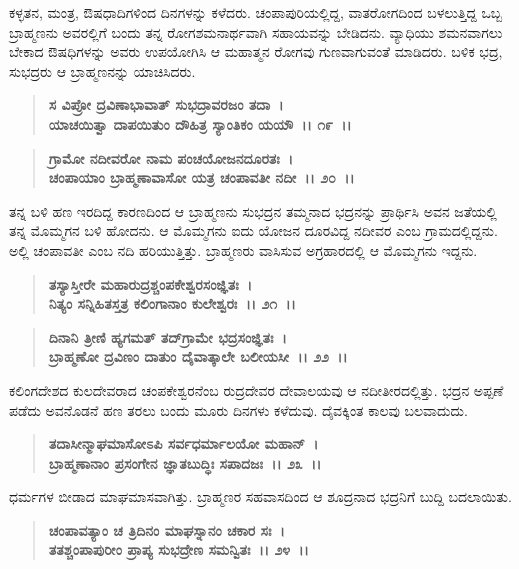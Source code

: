 ಕಳ್ಳತನ, ಮಂತ್ರ, ಔಷಧಾದಿಗಳಿಂದ ದಿನಗಳನ್ನು ಕಳೆದರು. ಚಂಪಾಪುರಿಯಲ್ಲಿದ್ದ, ವಾತರೋಗದಿಂದ ಬಳಲುತ್ತಿದ್ದ ಒಬ್ಬ ಬ್ರಾಹ್ಮಣನು ಅವರಲ್ಲಿಗೆ ಬಂದು ತನ್ನ ರೋಗಶಮನಾರ್ಥವಾಗಿ ಸಹಾಯವನ್ನು ಬೇಡಿದನು. ವ್ಯಾಧಿಯು ಶಮನವಾಗಲು ಬೇಕಾದ ಔಷಧಿಗಳನ್ನು ಅವರು ಉಪಯೋಗಿಸಿ ಆ ಮಹಾತ್ಮನ ರೋಗವು ಗುಣವಾಗುವಂತೆ ಮಾಡಿದರು. ಬಳಿಕ ಭದ್ರ, ಸುಭದ್ರರು ಆ ಬ್ರಾಹ್ಮಣನನ್ನು ಯಾಚಿಸಿದರು.

\begin{verse}
\textbf{ಸ ವಿಪ್ರೋ ದ್ರವಿಣಾಭಾವಾತ್ ಸುಭದ್ರಾವರಜಂ ತದಾ~।}\\\textbf{ಯಾಚಯಿತ್ವಾ ದಾಪಯಿತುಂ ದೌಹಿತ್ರ ಸ್ಯಾಂತಿಕಂ ಯಯೌ~।। ೧೯~।। }
\end{verse}

\begin{verse}
\textbf{ಗ್ರಾಮೋ ನದೀವರೋ ನಾಮ ಪಂಚಯೋಜನದೂರತಃ~।}\\\textbf{ಚಂಪಾಯಾಂ ಬ್ರಾಹ್ಮಣಾವಾಸೋ ಯತ್ರ ಚಂಪಾವತೀ ನದೀ~।। ೨೦~।।}
\end{verse}

ತನ್ನ ಬಳಿ ಹಣ ಇರದಿದ್ದ ಕಾರಣದಿಂದ ಆ ಬ್ರಾಹ್ಮಣನು ಸುಭದ್ರನ ತಮ್ಮನಾದ ಭದ್ರನನ್ನು ಪ್ರಾರ್ಥಿಸಿ ಅವನ ಜತೆಯಲ್ಲಿ ತನ್ನ ಮೊಮ್ಮಗನ ಬಳಿ ಹೋದನು. ಆ ಮೊಮ್ಮಗನು ಐದು ಯೋಜನ ದೂರವಿದ್ದ ನದೀವರ ಎಂಬ ಗ್ರಾಮದಲ್ಲಿದ್ದನು. ಅಲ್ಲಿ ಚಂಪಾವತೀ ಎಂಬ ನದಿ ಹರಿಯುತ್ತಿತ್ತು. ಬ್ರಾಹ್ಮಣರು ವಾಸಿಸುವ ಅಗ್ರಹಾರದಲ್ಲಿ ಆ ಮೊಮ್ಮಗನು ಇದ್ದನು.

\begin{verse}
\textbf{ತಸ್ಯಾಸ್ತೀರೇ ಮಹಾರುದ್ರಶ್ಚಂಪಕೇಶ್ವರಸಂಜ್ಞಿತಃ~।}\\\textbf{ನಿತ್ಯಂ ಸನ್ನಿಹಿತಸ್ತತ್ರ ಕಲಿಂಗಾನಾಂ ಕುಲೇಶ್ವರಃ~।। ೨೧~।। }
\end{verse}

\begin{verse}
\textbf{ದಿನಾನಿ ತ್ರೀಣಿ ಹ್ಯಗಮತ್ ತದ್‌ಗ್ರಾಮೇ ಭದ್ರಸಂಜ್ಞಿತಃ~।}\\\textbf{ಬ್ರಾಹ್ಮಣೋ ದ್ರವಿಣಂ ದಾತುಂ ದೈವಾತ್ಕಾಲೇ ಬಲೀಯಸೀ~।। ೨೨~।।}
\end{verse}

ಕಲಿಂಗದೇಶದ ಕುಲದೇವರಾದ ಚಂಪಕೇಶ್ವರನೆಂಬ ರುದ್ರದೇವರ ದೇವಾಲಯವು ಆ ನದೀತೀರದಲ್ಲಿತ್ತು. ಭದ್ರನ ಅಪ್ಪಣೆ ಪಡೆದು ಅವನೊಡನೆ ಹಣ ತರಲು ಬಂದು ಮೂರು ದಿನಗಳು ಕಳೆದುವು. ದೈವಕ್ಕಿಂತ ಕಾಲವು ಬಲವಾದುದು.

\begin{verse}
\textbf{ತದಾಸೀನ್ಮಾಘಮಾಸೋಽಪಿ ಸರ್ವಧರ್ಮಾಲಯೋ ಮಹಾನ್~।}\\\textbf{ಬ್ರಾಹ್ಮಣಾನಾಂ ಪ್ರಸಂಗೇನ ಜ್ಞಾತಬುದ್ಧಿಃ ಸಪಾದಜಃ~।। ೨೩~।।}
\end{verse}

ಧರ್ಮಗಳ ಬೀಡಾದ ಮಾಘಮಾಸವಾಗಿತ್ತು. ಬ್ರಾಹ್ಮಣರ ಸಹವಾಸದಿಂದ ಆ ಶೂದ್ರನಾದ ಭದ್ರನಿಗೆ ಬುದ್ದಿ ಬದಲಾಯಿತು.

\begin{verse}
\textbf{ಚಂಪಾವತ್ಯಾಂ ಚ ತ್ರಿದಿನಂ ಮಾಘಸ್ನಾನಂ ಚಕಾರ ಸಃ~।}\\\textbf{ತತಶ್ಚಂಪಾಪುರೀಂ ಪ್ರಾಪ್ಯ ಸುಭದ್ರೇಣ ಸಮನ್ವಿತಃ~।। ೨೪~।।}
\end{verse}

